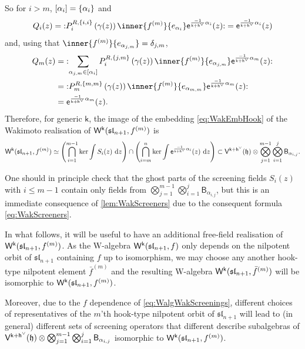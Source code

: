 \documentclass[10pt,a4paper]{amsart}
\numberwithin{equation}{section}
\renewcommand{\cong}{\simeq} %
\newcommand{\dd}{\mathrm{d}}   %
\newcommand{\ee}{\mathsf{e}}   %
\newcommand{\kk}{\mathsf{k}}   %
\DeclarePairedDelimiter{\brac}{\lparen}{\rparen}   %
\DeclarePairedDelimiter{\sqbrac}{\lbrack}{\rbrack} %
\DeclarePairedDelimiter{\set}{\lbrace}{\rbrace}
\newcommand{\no}[1]{\mathopen{:} #1 \mathclose{:}} %
\newcommand{\alg}[1]{\mathfrak{#1}}  %
\newcommand{\VOA}[1]{\mathsf{#1}}    %
\newcommand{\SLA}[2]{\alg{#1}_{#2}}                      %
\newcommand{\slnpone}{\SLA{sl}{n+1}}
\newcommand{\cartan}{\mathfrak{h}}
\newcommand{\cox}{\mathsf{h}}                                        %
\newcommand{\dcox}{\coroot{\cox}}                                    %
\newcommand{\sroot}[1]{\alpha_{#1}}                                  %
\newcommand{\coroot}[1]{#1^{\vee}}                                   %
\newcommand{\fhook}[1]{f^{(#1)}}                                  %
\newcommand{\Wsymb}{\VOA{W}}
\newcommand{\uaffvoa}[2]{\VOA{V}^{#1}\brac{#2}}                   %
\newcommand{\bgvoa}{\VOA{B}}                                      %
\newcommand{\uQHR}[3]{\Wsymb^{#1}\brac{#2,#3}}                    %
\theoremstyle{plain}
\begin{document}
So for $i > m$, $\sqbrac{\sroot{i}} = \set{\sroot{i}}$ and
%
\begin{equation}
    Q_i(z) =  \no{ P^{R,\set{i,i}}_{i} \left(\gamma(z)\right)  \inner{\fhook{m}}{e_{\alpha_{i}}} \ee^{\frac{-1}{\kk+\dcox} \alpha_{i}}(z)} 
    = \ee^{\frac{-1}{\kk+\dcox} \alpha_{i}}(z)
\end{equation}
%
and, using that $\inner{\fhook{m}}{e_{\alpha_{j,m}}} = \delta_{j,m}$,
%
\begin{align}
    Q_m(z) &= \no{\sum_{\alpha_{j,m} \in \sqbrac{\sroot{i}}} P^{R,\set{j,m}}_{i} \left(\gamma(z)\right)  \inner{\fhook{m}}{e_{\alpha_{j,m}}} \ee^{\frac{-1}{\kk+\dcox} \alpha_{m}}(z)} \\
    &= \no{P^{R,\set{m,m}}_{m} \left(\gamma(z)\right)  \inner{\fhook{m}}{e_{\alpha_{m,m}}} \ee^{\frac{-1}{\kk+\dcox} \alpha_{m}}(z)} \notag\\
    &= \ee^{\frac{-1}{\kk+\dcox} \alpha_{m}}(z). \notag
\end{align}
%
Therefore, for generic $\kk$, the image of the embedding \eqref{eq:WakEmbHook} of the Wakimoto realisation of $\uQHR{\kk}{\slnpone}{\fhook{m}}$ is 
%
\begin{equation} \label{eq:WakHookScreen}
    \uQHR{\kk}{\slnpone}{\fhook{m}} \cong \left( \bigcap_{i=1}^{m-1} \textup{ker} \int S_i(z) \ \dd z \right) \cap \left(  \bigcap_{i=m}^{n} \textup{ker} \int \ee^{\frac{-1}{\kk+\dcox} \alpha_{i}}(z) \ \dd z \right) \subset \uaffvoa{\kk+\dcox}{\cartan} \otimes \bigotimes_{j=1}^{m-1}\bigotimes_{i=1}^{j} \bgvoa_{\sroot{i,j}}.
\end{equation}

One should in principle check that the ghost parts of the screening fields $S_i(z)$ with $i \leq m-1$ contain only fields from $\bigotimes_{j=1}^{m-1}\bigotimes_{i=1}^{j} \bgvoa_{\sroot{i,j}}$, but this is an immediate consequence of \cref{lem:WakScreeners} due to the consequent formula \eqref{eq:WakScreeners}.

In what follows, it will be useful to have an additional free-field realisation of $\uQHR{\kk}{\slnpone}{\fhook{m}}$. As the W-algebra $\uQHR{\kk}{\slnpone}{f}$ only depends on the nilpotent orbit of $\slnpone$ containing $f$ up to isomorphism, we may choose any another hook-type nilpotent element $\bar{f}^{(m)}$ and the resulting W-algebra  $\uQHR{\kk}{\slnpone}{\bar{f}^{(m)}}$ will be isomorphic to $\uQHR{\kk}{\slnpone}{\fhook{m}}$. 

Moreover, due to the $f$ dependence of \eqref{eq:WalgWakScreenings}, different choices of representatives of the  $m$'th hook-type nilpotent orbit of $\slnpone$ will lead to (in general) different sets of screening operators that different describe subalgebras of $\uaffvoa{\kk+\dcox}{\cartan} \otimes \bigotimes_{j=1}^{m-1}\bigotimes_{i=1}^{j} \bgvoa_{\sroot{i,j}}$ isomorphic to $\uQHR{\kk}{\slnpone}{\fhook{m}}$. 
\end{document}
